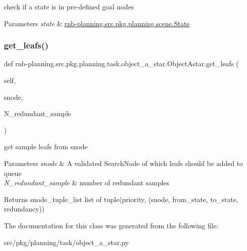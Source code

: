 check if a state is in pre-\/defined goal nodes 


\begin{DoxyParams}{Parameters}
{\em state} & \hyperlink{classrnb-planning_1_1src_1_1pkg_1_1planning_1_1scene_1_1_state}{rnb-\/planning.\+src.\+pkg.\+planning.\+scene.\+State} \\
\hline
\end{DoxyParams}
\mbox{\label{classrnb-planning_1_1src_1_1pkg_1_1planning_1_1task_1_1object__a__star_1_1_object_astar_a2cfff333be0d1e6f77f2474d65a80e21}} 
\subsubsection{\texorpdfstring{get\+\_\+leafs()}{get\_leafs()}}
{\footnotesize\ttfamily def rnb-\/planning.\+src.\+pkg.\+planning.\+task.\+object\+\_\+a\+\_\+star.\+Object\+Astar.\+get\+\_\+leafs (\begin{DoxyParamCaption}\item[{}]{self,  }\item[{}]{snode,  }\item[{}]{N\+\_\+redundant\+\_\+sample }\end{DoxyParamCaption})}



get sample leafs from snode 


\begin{DoxyParams}{Parameters}
{\em snode} & A validated Search\+Node of which leafs should be added to queue \\
\hline
{\em N\+\_\+redundant\+\_\+sample} & number of redundant samples \\
\hline
\end{DoxyParams}
\begin{DoxyReturn}{Returns}
snode\+\_\+tuple\+\_\+list list of tuple(priority, (snode, from\+\_\+state, to\+\_\+state, redundancy)) 
\end{DoxyReturn}


The documentation for this class was generated from the following file\+:\begin{DoxyCompactItemize}
\item 
src/pkg/planning/task/object\+\_\+a\+\_\+star.\+py\end{DoxyCompactItemize}

